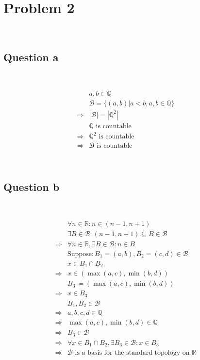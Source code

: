 \documentclass{article}
\begin{document}
\newpage

\section*{Problem 2}

~

\subsection*{Question a}

~

\begin{equation*}
    \begin{split}
        &a,b\in\mathbb{Q} \\
        &\mathcal{B} =\{(a,b)|a<b,a,b\in\mathbb{Q} \}\\
        \Rightarrow&|\mathcal{B}|=|\mathbb{Q}^2|\\
        &\mathbb{Q} \text{ is countable}\\
        \Rightarrow&\mathbb{Q}^2\text{ is countable}\\
        \Rightarrow&\mathcal{B}\text{ is countable}
    \end{split}
\end{equation*}

~

\subsection*{Question b}

~

\begin{equation*}
    \begin{split}
        &\forall n\in\mathbb{R} : n\in(n-1,n+1)\\
        &\exists B\in\mathcal{B} :(n-1,n+1)\subseteq B\in\mathcal{B}\\
        \Rightarrow&\forall n\in\mathbb{R},\exists B\in\mathcal{B}:n\in B\\
        &\text{Suppose}:B_1=(a,b),B_2=(c,d)\in\mathcal{B}\\
        &x\in B_1\cap B_2\\
        \Rightarrow&x\in(\max(a,c),\min(b,d))\\
        &B_3\coloneqq (\max(a,c),\min(b,d))\\
        \Rightarrow&x\in B_3\\
        &B_1,B_2\in \mathcal{B} \\
        \Rightarrow&a,b,c,d\in\mathbb{Q} \\
        \Rightarrow&\max(a,c),\min(b,d)\in\mathbb{Q} \\
        \Rightarrow&B_3\in\mathcal{B} \\
        \Rightarrow&\forall x\in B_1\cap B_2,\exists B_3\in\mathcal{B}:x\in B_3\\
        \Rightarrow&\mathcal{B} \text{ is a basis for the standard topology on }\mathbb{R} 
    \end{split}
\end{equation*}
\end{document}
